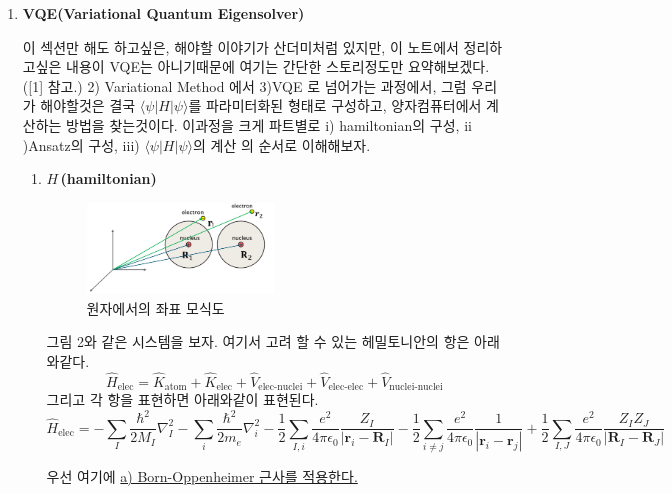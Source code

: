 \documentclass[11pt]{article}
\begin{document}
\begin{enumerate}[label=3)]
\item {\Large \textbf{VQE(Variational Quantum Eigensolver)}}

이 섹션만 해도 하고싶은, 해야할 이야기가 산더미처럼 있지만, 이 노트에서 정리하고싶은 내용이 VQE는 아니기때문에 여기는 간단한 스토리정도만 요약해보겠다.([1] 참고.)
2) Variational Method 에서 3)VQE 로 넘어가는 과정에서, 그럼 우리가 해야할것은 결국 \(\langle \psi|H|\psi \rangle\)를 파라미터화된 형태로 구성하고, 양자컴퓨터에서 계산하는 방법을 찾는것이다. 
이과정을 크게 파트별로 \(\mathrm{i}\)) hamiltonian의 구성, \(\mathrm{ii}\))Ansatz의 구성, \(\mathrm{iii}\)) \(\langle \psi|H|\psi \rangle\)의 계산 의 순서로 이해해보자. 
\begin{enumerate}[label=\(\mathrm{i}\))]
\item {\(H\)\,\textbf{(hamiltonian)}}

\begin{figure}[htbp]
  \centering
  \includegraphics[width=0.5\textwidth]{fig/원자좌표.png}
  \caption{원자에서의 좌표 모식도}
  \label{fig:example2}
\end{figure}

그림 2와 같은 시스템을 보자. 여기서 고려 할 수 있는 헤밀토니안의 항은 아래와같다. 
\[
\hat{H}_{\text{elec}} = \hat{K}_{\text{atom}} + \hat{K}_{\text{elec}} 
+ \hat{V}_{\text{elec-nuclei}} + \hat{V}_{\text{elec-elec}} + \hat{V}_{\text{nuclei-nuclei}}
\]
그리고 각 항을 표현하면 아래와같이 표현된다. 
\[
\hat{H}_{\text{elec}} = - \sum_I \frac{\hbar^2}{2 M_I} \nabla_I^2
- \sum_i \frac{\hbar^2}{2 m_e} \nabla_i^2
- \frac{1}{2} \sum_{I,i} \frac{e^2}{4 \pi \epsilon_0} \frac{Z_I}{|\mathbf{r}_i - \mathbf{R}_I|}
- \frac{1}{2} \sum_{i \ne j} \frac{e^2}{4 \pi \epsilon_0} \frac{1}{|\mathbf{r}_i - \mathbf{r}_j|}
+ \frac{1}{2} \sum_{I,J} \frac{e^2}{4 \pi \epsilon_0} \frac{Z_I Z_J}{|\mathbf{R}_I - \mathbf{R}_J|}
\]

우선 여기에 \underline{a) Born-Oppenheimer 근사를 적용한다.} 
\begin{tcolorbox}[enhanced, breakable, colback=gray!10, colframe=black, title=Definition: Born-oppenheimer Approximation]



\end{tcolorbox}
\end{enumerate}
\end{enumerate}
\end{document}

